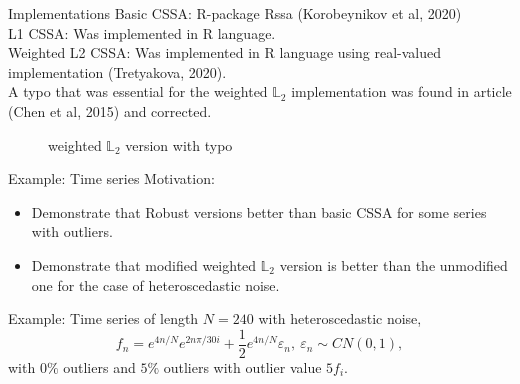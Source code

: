\documentclass[ucs, notheorems, handout]{beamer}
\begin{document}
\begin{frame}{Implementations}
    \alert{Basic CSSA}: R-package Rssa (Korobeynikov et al, 2020)\\
    \vspace{1em}
    \alert{L1 CSSA}: Was implemented in R language.\\
    \vspace{1em}
    \alert{Weighted L2 CSSA}: Was implemented in R language using real-valued implementation (Tretyakova, 2020).\\
    \vspace{1em}
    A typo that was essential for the weighted $\mathbb{L}_2$ implementation was found in article (Chen et al, 2015) and corrected.
    \begin{figure}[ht]
    \caption{weighted $\mathbb{L}_2$ version with typo}
    \end{figure}
\end{frame}

\begin{frame}{Example: Time series}
    Motivation:
    \begin{itemize}
        \item Demonstrate that Robust versions better than basic CSSA for some series with outliers.
        \item Demonstrate that modified weighted $\mathbb{L}_2$ version is better than the unmodified one for the case of heteroscedastic noise.
    \end{itemize}
    \vspace{1em}
    \alert{Example}:
    Time series of length $N = 240$ with heteroscedastic noise,
    $$f_n = e^{4n/N} e^{2n\pi/30i} + \frac{1}{2}e^{4n/N} \varepsilon_n, ~ \varepsilon_n \sim CN(0,1),$$
    with $0\%$ outliers and $5\%$ outliers with outlier value $5f_i$.
\end{frame}
\end{document}
